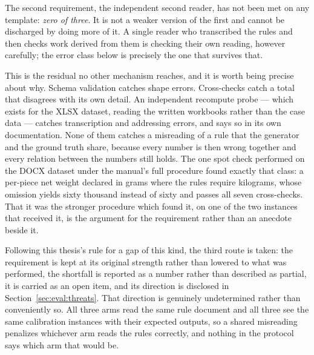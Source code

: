 The second requirement, the independent second reader, has not been met on any template:
\emph{zero of three}. It is not a weaker version of the first and cannot be discharged by
doing more of it. A single reader who transcribed the rules and then checks work derived from
them is checking their own reading, however carefully; the error class below is precisely the
one that survives that.

This is the residual no other mechanism reaches, and it is worth being precise about why.
Schema validation catches shape errors. Cross-checks catch a total that disagrees with its own
detail. An independent recompute probe --- which exists for the XLSX dataset, reading the
written workbooks rather than the case data --- catches transcription and addressing errors,
and says so in its own documentation. None of them catches a misreading of a rule that the
generator and the ground truth share, because every number is then wrong together and every
relation between the numbers still holds. The one spot check performed on the DOCX dataset under the manual's
full procedure found exactly that class: a per-piece net weight declared in grams where the
rules require kilograms, whose omission yields sixty thousand instead of sixty and passes all
seven cross-checks. That it was the stronger procedure which found it, on one of the two
instances that received it, is the argument for the requirement rather than an anecdote
beside it.

Following this thesis's rule for a gap of this kind, the third route is taken: the requirement
is kept at its original strength rather than lowered to what was performed, the shortfall is
reported as a number rather than described as partial, it is carried as an open item, and its
direction is disclosed in Section~\ref{sec:eval:threats}. That
direction is genuinely undetermined rather than conveniently so. All three arms read the same
rule document and all three see the same calibration instances with their expected outputs, so
a shared misreading penalizes whichever arm reads the rules correctly, and nothing in the
protocol says which arm that would be.

